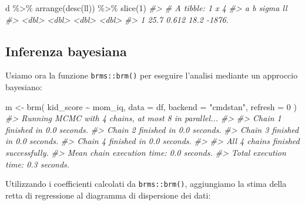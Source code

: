 \documentclass[
  10pt,
  italian,
  a4paper,
  extrafontsizes,onecolumn,openright
  ]{memoir}
\newenvironment{Shaded}{\begin{snugshade}}{\end{snugshade}}
\newcommand{\AttributeTok}[1]{\textcolor[rgb]{0.77,0.63,0.00}{#1}}
\newcommand{\CommentTok}[1]{\textcolor[rgb]{0.56,0.35,0.01}{\textit{#1}}}
\newcommand{\DecValTok}[1]{\textcolor[rgb]{0.00,0.00,0.81}{#1}}
\newcommand{\FunctionTok}[1]{\textcolor[rgb]{0.00,0.00,0.00}{#1}}
\newcommand{\NormalTok}[1]{#1}
\newcommand{\OtherTok}[1]{\textcolor[rgb]{0.56,0.35,0.01}{#1}}
\newcommand{\SpecialCharTok}[1]{\textcolor[rgb]{0.00,0.00,0.00}{#1}}
\newcommand{\StringTok}[1]{\textcolor[rgb]{0.31,0.60,0.02}{#1}}
\begin{document}
\begin{Shaded}
\begin{Highlighting}[]
\NormalTok{d }\SpecialCharTok{\%\textgreater{}\%} 
  \FunctionTok{arrange}\NormalTok{(}\FunctionTok{desc}\NormalTok{(ll)) }\SpecialCharTok{\%\textgreater{}\%} 
  \FunctionTok{slice}\NormalTok{(}\DecValTok{1}\NormalTok{)}
\CommentTok{\#\textgreater{} \# A tibble: 1 x 4}
\CommentTok{\#\textgreater{}       a     b sigma     ll}
\CommentTok{\#\textgreater{}   \textless{}dbl\textgreater{} \textless{}dbl\textgreater{} \textless{}dbl\textgreater{}  \textless{}dbl\textgreater{}}
\CommentTok{\#\textgreater{} 1  25.7 0.612  18.2 {-}1876.}
\end{Highlighting}
\end{Shaded}

\hypertarget{inferenza-bayesiana}{%
\subsection{Inferenza bayesiana}\label{inferenza-bayesiana}}

Usiamo ora la funzione \texttt{brms::brm()} per eseguire l'analisi mediante un approccio bayesiano:

\begin{Shaded}
\begin{Highlighting}[]
\NormalTok{m }\OtherTok{\textless{}{-}}
  \FunctionTok{brm}\NormalTok{(}
\NormalTok{    kid\_score }\SpecialCharTok{\textasciitilde{}}\NormalTok{ mom\_iq,}
    \AttributeTok{data =}\NormalTok{ df, }
    \AttributeTok{backend =} \StringTok{"cmdstan"}\NormalTok{,}
    \AttributeTok{refresh =} \DecValTok{0}
\NormalTok{  )}
\CommentTok{\#\textgreater{} Running MCMC with 4 chains, at most 8 in parallel...}
\CommentTok{\#\textgreater{} }
\CommentTok{\#\textgreater{} Chain 1 finished in 0.0 seconds.}
\CommentTok{\#\textgreater{} Chain 2 finished in 0.0 seconds.}
\CommentTok{\#\textgreater{} Chain 3 finished in 0.0 seconds.}
\CommentTok{\#\textgreater{} Chain 4 finished in 0.0 seconds.}
\CommentTok{\#\textgreater{} }
\CommentTok{\#\textgreater{} All 4 chains finished successfully.}
\CommentTok{\#\textgreater{} Mean chain execution time: 0.0 seconds.}
\CommentTok{\#\textgreater{} Total execution time: 0.3 seconds.}
\end{Highlighting}
\end{Shaded}

Utilizzando i coefficienti calcolati da \texttt{brms::brm()}, aggiungiamo la stima della retta di regressione al diagramma di dispersione dei dati:
\end{document}
